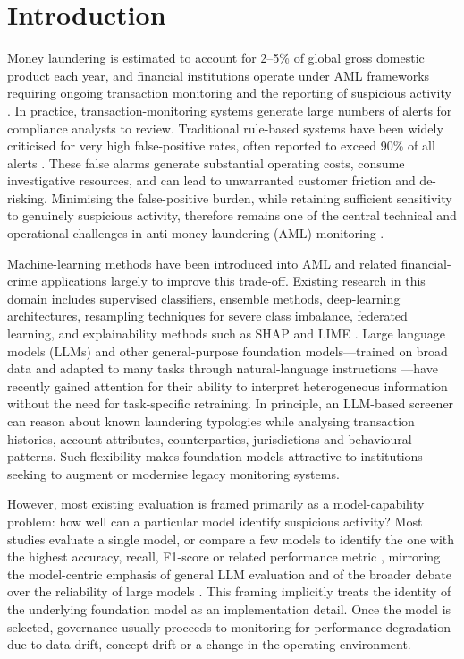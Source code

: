 \documentclass[pdflatex,sn-basic,Numbered]{sn-jnl}
\begin{document}
\section{Introduction}\label{sec:intro}

Money laundering is estimated to account for 2--5\% of global gross domestic product each year, and financial institutions operate under AML frameworks requiring ongoing transaction monitoring and the reporting of suspicious activity \cite{fatf-recs,unodc}. In practice, transaction-monitoring systems generate large numbers of alerts for compliance analysts to review. Traditional rule-based systems have been widely criticised for very high false-positive rates, often reported to exceed 90\% of all alerts \cite{jensen}. These false alarms generate substantial operating costs, consume investigative resources, and can lead to unwarranted customer friction and de-risking. Minimising the false-positive burden, while retaining sufficient sensitivity to genuinely suspicious activity, therefore remains one of the central technical and operational challenges in anti-money-laundering (AML) monitoring \cite{alhashedi,smote,goecks,imbalance}.

Machine-learning methods have been introduced into AML and related financial-crime applications largely to improve this trade-off. Existing research in this domain includes supervised classifiers, ensemble methods, deep-learning architectures, resampling techniques for severe class imbalance, federated learning, and explainability methods such as SHAP and LIME \cite{alhashedi,disc-alshatri,disc-bekkaye,goecks,imbalance,shap,disc-najem,lime,disc-yang,amlsim}. Large language models (LLMs) and other general-purpose foundation models---trained on broad data and adapted to many tasks through natural-language instructions \cite{fewshot,foundation}---have recently gained attention for their ability to interpret heterogeneous information without the need for task-specific retraining. In principle, an LLM-based screener can reason about known laundering typologies while analysing transaction histories, account attributes, counterparties, jurisdictions and behavioural patterns. Such flexibility makes foundation models attractive to institutions seeking to augment or modernise legacy monitoring systems.

However, most existing evaluation is framed primarily as a model-capability problem: how well can a particular model identify suspicious activity? Most studies evaluate a single model, or compare a few models to identify the one with the highest accuracy, recall, F1-score or related performance metric \cite{disc-alshatri,disc-bekkaye,disc-najem,disc-yang}, mirroring the model-centric emphasis of general LLM evaluation and of the broader debate over the reliability of large models \cite{helm,parrots}. This framing implicitly treats the identity of the underlying foundation model as an implementation detail. Once the model is selected, governance usually proceeds to monitoring for performance degradation due to data drift, concept drift or a change in the operating environment.
\end{document}
